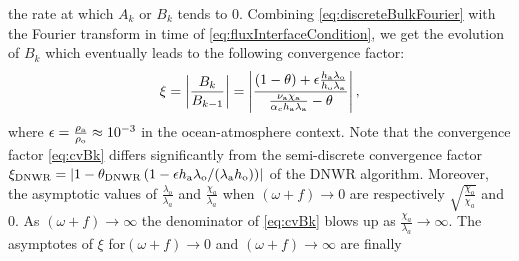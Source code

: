 the rate at which $A_k$ or $B_k$ tends to 0.
Combining \eqref{eq:discreteBulkFourier} with
the Fourier transform in time of \eqref{eq:fluxInterfaceCondition},
we get the evolution of $B_k$ which eventually leads to 
the following convergence factor: 
%
\begin{equation} \label{eq:cvBk}
\xi = \left|\frac{B_k}{B_{k-1}}\right| = 
\left|\frac{
\left(1-\theta\right)
+ \epsilon\frac{h_{\rm a} \lambda_{\rm o}}{h_{\rm o} \lambda_{\rm a}}
}{
\frac{\nu_{\rm a}\chi_{\rm a}}{\alpha_c h_{\rm a} \lambda_{\rm a}} - \theta}\right|,
\end{equation}
where $\epsilon = \frac{\rho_{\rm a}}{\rho_{\rm o}} \approx 10^{-3}$
in the ocean-atmosphere  context.
Note that the convergence factor \eqref{eq:cvBk} differs significantly from the semi-discrete convergence factor 
$\xi_{\rm DNWR} = \left|1 - \theta_{\rm DNWR} \left(
1 - \epsilon h_{\rm a} \lambda_{\rm o} / (\lambda_{\rm a}h_{\rm o})\right) \right|$ of 
the DNWR algorithm. 
Moreover, the asymptotic values of $\frac{\lambda_o}{\lambda_a}$
and $\frac{\chi_a}{\lambda_a}$ when $(\omega+f) \rightarrow 0$
are respectively $\sqrt{\frac{\chi_o}{\chi_a}}$ and 0.
As $(\omega+f) \rightarrow \infty$ the denominator of
\eqref{eq:cvBk} blows up as
$\frac{\chi_a}{\lambda_a} \rightarrow \infty$. The asymptotes
of $\xi$ for$(\omega+f) \rightarrow 0$ and
$(\omega+f) \rightarrow \infty$ are finally
